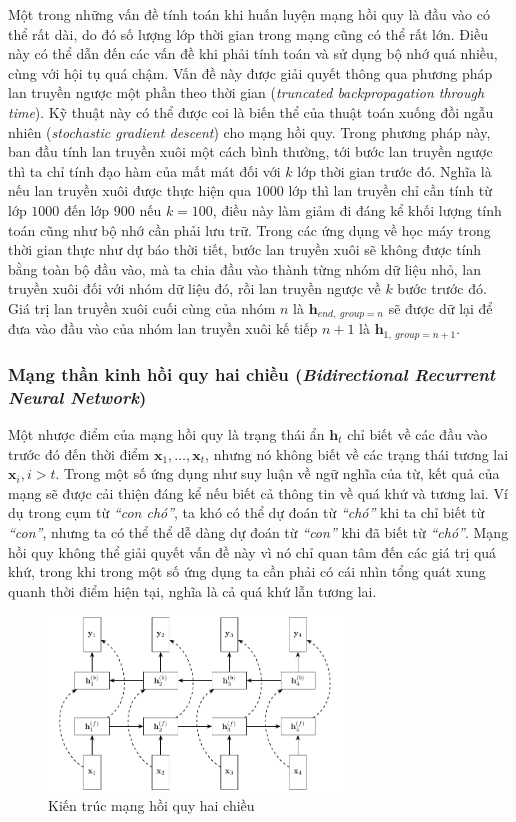 Một trong những vấn đề tính toán khi huấn luyện mạng hồi quy là đầu vào có thể rất dài, do đó số lượng lớp thời gian trong mạng cũng có thể rất lớn. Điều này có thể dẫn đến các vấn đề khi phải tính toán và sử dụng bộ nhớ quá nhiều, cùng với hội tụ quá chậm. Vấn đề này được giải quyết thông qua phương pháp lan truyền ngược một phần theo thời gian (\textit{truncated backpropagation through time}). Kỹ thuật này có thể được coi là biến thể của thuật toán xuống đồi ngẫu nhiên (\textit{stochastic gradient descent}) cho mạng hồi quy. Trong phương pháp này, ban đầu tính lan truyền xuôi một cách bình thường, tới bước lan truyền ngược thì ta chỉ tính đạo hàm của mất mát đối với $k$ lớp thời gian trước đó. Nghĩa là nếu lan truyền xuôi được thực hiện qua $1000$ lớp thì lan truyền chỉ cần tính từ lớp $1000$ đến lớp $900$ nếu $k=100$, điều này làm giảm đi đáng kể khối lượng tính toán cũng như bộ nhớ cần phải lưu trữ. Trong các ứng dụng về học máy trong thời gian thực như dự báo thời tiết, bước lan truyền xuôi sẽ không được tính bằng toàn bộ đầu vào, mà ta chia đầu vào thành từng nhóm dữ liệu nhỏ, lan truyền xuôi đối với nhóm dữ liệu đó, rồi lan truyền ngược về $k$ bước trước đó. Giá trị lan truyền xuôi cuối cùng của nhóm $n$ là $\mathbf h_{end,\ group=n}$ sẽ được dữ lại để đưa vào đầu vào của nhóm lan truyền xuôi kế tiếp $n+1$ là $\mathbf h_{1,\ group=n+1}$. \cite{Aggarwal2023-zk}

\subsubsection{Mạng thần kinh hồi quy hai chiều (\textit{Bidirectional Recurrent Neural Network})}
Một nhược điểm của mạng hồi quy là trạng thái ẩn $\mathbf h_t$ chỉ biết về các đầu vào trước đó đến thời điểm $\mathbf x_1,\dots,\mathbf x_t$, nhưng nó không biết về các trạng thái tương lai $\mathbf x_i,i>t$. Trong một số ứng dụng như suy luận về ngữ nghĩa của từ, kết quả của mạng sẽ được cải thiện đáng kể nếu biết cả thông tin về quá khứ và tương lai. Ví dụ trong cụm từ \textit{``con chó''}, ta khó có thể dự đoán từ \textit{``chó''} khi ta chỉ biết từ \textit{``con''}, nhưng ta có thể thể dễ dàng dự đoán từ \textit{``con''} khi đã biết từ \textit{``chó''}. Mạng hồi quy không thể giải quyết vấn đề này vì nó chỉ quan tâm đến các giá trị quá khứ, trong khi trong một số ứng dụng ta cần phải có cái nhìn tổng quát xung quanh thời điểm hiện tại, nghĩa là cả quá khứ lẫn tương lai.
\begin{figure}[htb]
    \centering
    \includegraphics[width=0.7\textwidth]{tikz_image/rnn_bidirectional_architecture.pdf}
    \caption{Kiến trúc mạng hồi quy hai chiều}
    \label{figure:rnn-bidirectional-architecture}
\end{figure}

